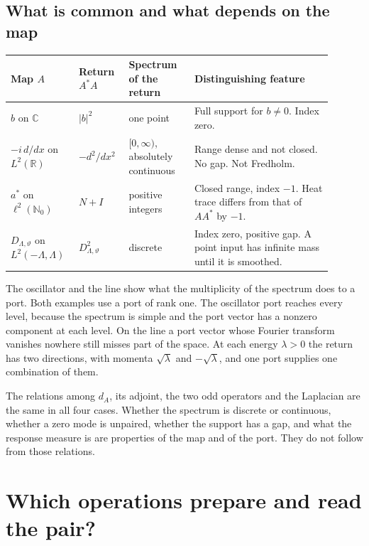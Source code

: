 \documentclass[11pt]{article}
\theoremstyle{definition}
\newcommand{\C}{\mathbb C}
\newcommand{\R}{\mathbb R}
\begin{document}
\subsection{What is common and what depends on the map}
\label{subsec:four-maps-table}

\begin{center}
\small
\begin{tabular}{@{}p{0.17\linewidth}p{0.14\linewidth}p{0.19\linewidth}p{0.40\linewidth}@{}}
\toprule
Map $A$ & Return $A^*A$ & Spectrum of the return & Distinguishing feature \\
\midrule
\raggedright $b$ on $\C$ & $|b|^2$ & \raggedright one point & Full support for $b\ne0$. Index zero. \\[2pt]
\raggedright $-i\,d/dx$ on $L^2(\R)$ & $-d^2/dx^2$ & \raggedright $[0,\infty)$, absolutely continuous & Range dense and not closed. No gap. Not Fredholm. \\[2pt]
\raggedright $a^*$ on $\ell^2(\mathbb N_0)$ & $N+I$ & \raggedright positive integers & Closed range, index $-1$. Heat trace differs from that of $AA^*$ by $-1$. \\[2pt]
\raggedright $D_{\Lambda,\vartheta}$ on $L^2(-\Lambda,\Lambda)$ & $D_{\Lambda,\vartheta}^2$ & \raggedright discrete & Index zero, positive gap. A point input has infinite mass until it is smoothed. \\
\bottomrule
\end{tabular}
\end{center}

The oscillator and the line show what the multiplicity of the spectrum does to a port. Both examples use a port of rank one. The oscillator port reaches every level, because the spectrum is simple and the port vector has a nonzero component at each level. On the line a port vector whose Fourier transform vanishes nowhere still misses part of the space. At each energy $\lambda>0$ the return has two directions, with momenta $\sqrt\lambda$ and $-\sqrt\lambda$, and one port supplies one combination of them.

The relations among $d_A$, its adjoint, the two odd operators and the Laplacian are the same in all four cases. Whether the spectrum is discrete or continuous, whether a zero mode is unpaired, whether the support has a gap, and what the response measure is are properties of the map and of the port. They do not follow from those relations.

\section{Which operations prepare and read the pair?}
\label{sec:pair-currents}
\end{document}
